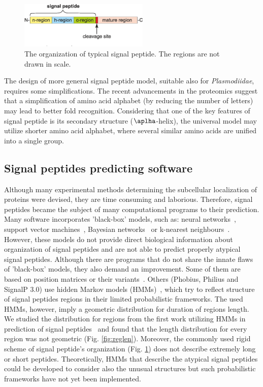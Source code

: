 \documentclass[10pt,letterpaper]{article}
\begin{document}
\begin{figure}[ht]\centering
\includegraphics[width=0.55\textwidth]{figures/SP.eps}
\caption{The organization of typical signal peptide. The regions are not drawn in scale.}
\label{fig:sparch}
\end{figure}

The design of more general signal peptide model, suitable also for \textit{Plasmodiidae}, requires some simplifications. The recent advancements in the proteomics suggest that a simplification of amino acid alphabet (by reducing the number of letters) may lead to better fold recognition. Considering that one of the key features of signal peptide is its secondary structure ($\aplha$-helix), the universal model may utilize shorter amino acid alphabet, where several similar amino acids are unified into a single group.

\subsection*{Signal peptides predicting software}

Although many experimental methods determining the subcellular localization of proteins were devised, they are time consuming and laborious. Therefore, signal peptides became the subject of many computational programs to their prediction. Many software incorporates 'black-box’ models, such as: neural networks~\cite{2011petersensignalp}, support vector machines~\cite{2014zhangprediction}, Bayesian networks~\cite{2012zhengsignalbnf} or k-nearest neighbours~\cite{2007shensignall}. However, these models do not provide direct biological information about organization of signal peptides and are not able to predict properly atypical signal peptides. Although there are programs that do not share the innate flaws of 'black-box' models, they also demand an improvement. Some of them are based on position matrices or their variants~\cite{2014zhangprediction, 2004hillerpredisi}. Others (Phobius, Philius and SignalP 3.0) use hidden Markov models (HMMs)~\cite{2004klla, 2008reynoldstransmembrane, 2004bendtsenimproved}, which try to reflect structure of signal peptides regions in their limited probabilistic frameworks. The used HMMs, however, imply a geometric distribution for duration of regions length. We studied the distribution for regions from the first work utilizing HMMs in prediction of signal peptides~\cite{1998nielsenprediction} and found that the length distribution for every region was not geometric (Fig. \ref{fig:reglen}). Moreover, the commonly used rigid scheme of signal peptide's organization (Fig. \ref{fig:sparch}) does not describe extremely long or short peptides. Theoretically, HMMs that describe the atypical signal peptides could be developed to consider also the unusual structures but such probabilistic frameworks have not yet been implemented.
\end{document}
